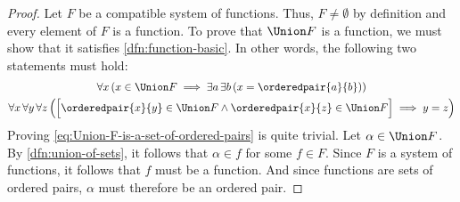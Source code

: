 \begin{proof}
    Let \( F \) be a compatible system of functions. Thus, \( F \neq \emptyset \) by definition
    and every element of \( F \) is a function. To prove that \( \Union F \) is a function, we must
    show that it satisfies \cref{dfn:function-basic}. In other words, the following two statements must hold:
    \begin{gather}
        \forall x \, \mleft( x \in \Union F \implies
        \exists a \, \exists b \, \mleft( x = \orderedpair{a}{b} \mright) \mright) \label{eq:Union-F-is-a-set-of-ordered-pairs} \\
        \forall x \, \forall y \, \forall z \, \mleft( \Big[\orderedpair{x}{y} \in \Union F
        \land \orderedpair{x}{z} \in \Union F \Big] \implies y = z \mright) \label{eq:Union-F-has-unique-first-coordinate}
    \end{gather}
    Proving \eqref{eq:Union-F-is-a-set-of-ordered-pairs} is quite trivial. Let \( \alpha \in \Union F \). By \cref{dfn:union-of-sets},
    it follows that \( \alpha \in f \) for some \( f \in F \). Since \( F \) is a system of functions, it follows that \( f \) must
    be a function. And since functions are sets of ordered pairs, \( \alpha \) must therefore be an ordered pair.


\end{proof}
